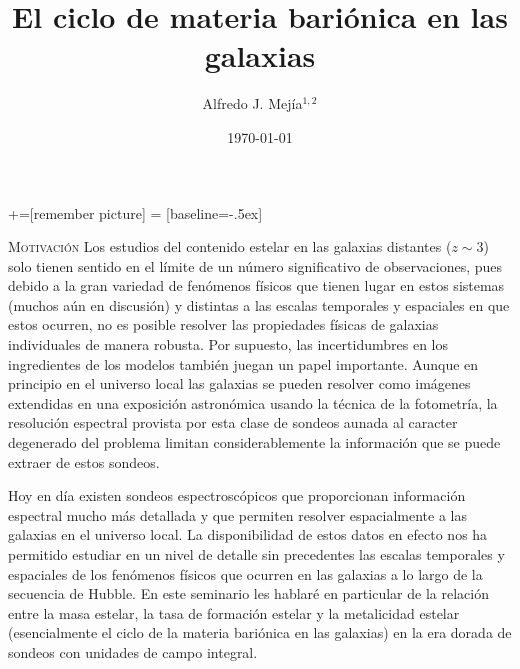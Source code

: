 \documentclass[xcolor=dvipsnames,4pt,hyperref={colorlinks,citecolor=black,linkcolor=black,urlcolor=black}]{beamer}
\begin{document}
+=[remember picture]
 = [baseline=-.5ex]

\begin{frame}
\title{El ciclo de materia bariónica en las galaxias}
\author{Alfredo J. Mej\'ia$^{1,2}$}

\date{\today}


\maketitle
\end{frame}

\begin{frame}[allowframebreaks]{\textsc{Motivación}}
%
Los estudios del contenido estelar en las galaxias distantes ($z\sim3$) solo tienen sentido en el
límite de un número significativo de observaciones, pues debido a la gran variedad de fenómenos
físicos que tienen lugar en estos sistemas (muchos aún en discusión) y distintas a las escalas
temporales y espaciales en que estos ocurren, no es posible resolver las propiedades físicas de
galaxias individuales de manera robusta. Por supuesto, las incertidumbres en los ingredientes de los
modelos también juegan un papel importante. Aunque en principio en el universo local las galaxias se
pueden resolver como imágenes extendidas en una exposición astronómica usando la técnica de la
fotometría, la resolución espectral provista por esta clase de sondeos aunada al caracter degenerado
del problema limitan considerablemente la información que se puede extraer de estos sondeos.

Hoy en día existen sondeos espectroscópicos que proporcionan información espectral mucho más
detallada y que permiten resolver espacialmente a las galaxias en el universo local. La
disponibilidad de estos datos en efecto nos ha permitido estudiar en un nivel de detalle sin
precedentes las escalas temporales y espaciales de los fenómenos físicos que ocurren en las galaxias
a lo largo de la secuencia de Hubble. En este seminario les hablaré en particular de la relación
entre la masa estelar, la tasa de formación estelar y la metalicidad estelar (esencialmente el ciclo
de la materia bariónica en las galaxias) en la era dorada de sondeos con unidades de campo integral.
%
\end{frame}
\end{document}

